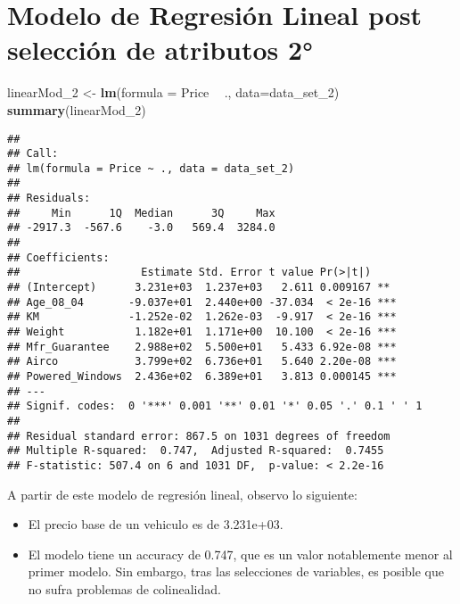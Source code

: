 \documentclass[]{article}
\newenvironment{Shaded}{\begin{snugshade}}{\end{snugshade}}
\newcommand{\DataTypeTok}[1]{\textcolor[rgb]{0.13,0.29,0.53}{#1}}
\newcommand{\DecValTok}[1]{\textcolor[rgb]{0.00,0.00,0.81}{#1}}
\newcommand{\KeywordTok}[1]{\textcolor[rgb]{0.13,0.29,0.53}{\textbf{#1}}}
\newcommand{\NormalTok}[1]{#1}
\newcommand{\OperatorTok}[1]{\textcolor[rgb]{0.81,0.36,0.00}{\textbf{#1}}}
\newcommand{\StringTok}[1]{\textcolor[rgb]{0.31,0.60,0.02}{#1}}
\providecommand{\tightlist}{%
  \setlength{\itemsep}{0pt}\setlength{\parskip}{0pt}}
\begin{document}
\hypertarget{modelo-de-regresion-lineal-post-seleccion-de-atributos-2}{%
\section{Modelo de Regresión Lineal post selección de atributos
2°}\label{modelo-de-regresion-lineal-post-seleccion-de-atributos-2}}

\begin{Shaded}
\begin{Highlighting}[]
\NormalTok{linearMod_}\DecValTok{2}\NormalTok{ <-}\StringTok{ }\KeywordTok{lm}\NormalTok{(}\DataTypeTok{formula =}\NormalTok{ Price }\OperatorTok{~}\StringTok{ }\NormalTok{., }\DataTypeTok{data=}\NormalTok{data_set_}\DecValTok{2}\NormalTok{)}
\KeywordTok{summary}\NormalTok{(linearMod_}\DecValTok{2}\NormalTok{)}
\end{Highlighting}
\end{Shaded}

\begin{verbatim}
## 
## Call:
## lm(formula = Price ~ ., data = data_set_2)
## 
## Residuals:
##     Min      1Q  Median      3Q     Max 
## -2917.3  -567.6    -3.0   569.4  3284.0 
## 
## Coefficients:
##                   Estimate Std. Error t value Pr(>|t|)    
## (Intercept)      3.231e+03  1.237e+03   2.611 0.009167 ** 
## Age_08_04       -9.037e+01  2.440e+00 -37.034  < 2e-16 ***
## KM              -1.252e-02  1.262e-03  -9.917  < 2e-16 ***
## Weight           1.182e+01  1.171e+00  10.100  < 2e-16 ***
## Mfr_Guarantee    2.988e+02  5.500e+01   5.433 6.92e-08 ***
## Airco            3.799e+02  6.736e+01   5.640 2.20e-08 ***
## Powered_Windows  2.436e+02  6.389e+01   3.813 0.000145 ***
## ---
## Signif. codes:  0 '***' 0.001 '**' 0.01 '*' 0.05 '.' 0.1 ' ' 1
## 
## Residual standard error: 867.5 on 1031 degrees of freedom
## Multiple R-squared:  0.747,  Adjusted R-squared:  0.7455 
## F-statistic: 507.4 on 6 and 1031 DF,  p-value: < 2.2e-16
\end{verbatim}

A partir de este modelo de regresión lineal, observo lo siguiente:

\begin{itemize}
\tightlist
\item
  El precio base de un vehiculo es de 3.231e+03.\\
\item
  El modelo tiene un accuracy de 0.747, que es un valor notablemente
  menor al primer modelo. Sin embargo, tras las selecciones de
  variables, es posible que no sufra problemas de colinealidad.
\end{itemize}
\end{document}
